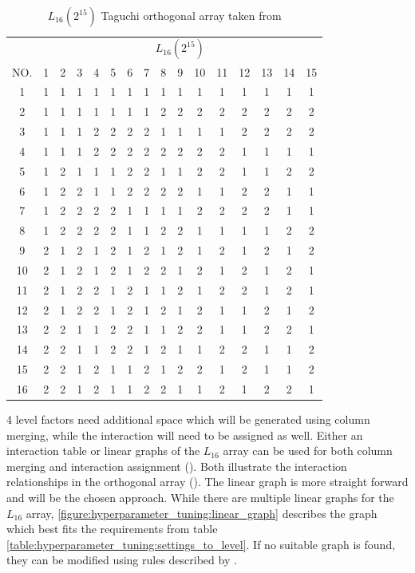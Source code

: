 \begin{table}[h]
	\label{table:hyperparameter_tuning:L16_orhtogonal_array}
	\centering
\begin{tabular}{ |c||c|c|c|c|c|c|c|c|c|c|c|c|c|c|c|  }
	\hline
	   & \multicolumn{15}{c|}{ $L_{16}(2^{15})$ } \\
	NO.& 1 & 2 & 3 & 4 & 5 & 6 & 7 & 8 & 9 & 10& 11& 12& 13& 14&15\\
	\hline
	1  & 1 & 1 & 1 & 1 & 1 & 1 & 1 & 1 & 1 & 1 & 1 & 1 & 1 & 1 & 1\\
	2  & 1 & 1 & 1 & 1 & 1 & 1 & 1 & 2 & 2 & 2 & 2 & 2 & 2 & 2 & 2\\
	3  & 1 & 1 & 1 & 2 & 2 & 2 & 2 & 1 & 1 & 1 & 1 & 2 & 2 & 2 & 2\\
	4  & 1 & 1 & 1 & 2 & 2 & 2 & 2 & 2 & 2 & 2 & 2 & 1 & 1 & 1 & 1\\
	5  & 1 & 2 & 1 & 1 & 1 & 2 & 2 & 1 & 1 & 2 & 2 & 1 & 1 & 2 & 2\\
	6  & 1 & 2 & 2 & 1 & 1 & 2 & 2 & 2 & 2 & 1 & 1 & 2 & 2 & 1 & 1\\
	7  & 1 & 2 & 2 & 2 & 2 & 1 & 1 & 1 & 1 & 2 & 2 & 2 & 2 & 1 & 1\\
	8  & 1 & 2 & 2 & 2 & 2 & 1 & 1 & 2 & 2 & 1 & 1 & 1 & 1 & 2 & 2\\
	9  & 2 & 1 & 2 & 1 & 2 & 1 & 2 & 1 & 2 & 1 & 2 & 1 & 2 & 1 & 2\\
	10 & 2 & 1 & 2 & 1 & 2 & 1 & 2 & 2 & 1 & 2 & 1 & 2 & 1 & 2 & 1\\
	11 & 2 & 1 & 2 & 2 & 1 & 2 & 1 & 1 & 2 & 1 & 2 & 2 & 1 & 2 & 1\\
	12 & 2 & 1 & 2 & 2 & 1 & 2 & 1 & 2 & 1 & 2 & 1 & 1 & 2 & 1 & 2\\
	13 & 2 & 2 & 1 & 1 & 2 & 2 & 1 & 1 & 2 & 2 & 1 & 1 & 2 & 2 & 1\\
	14 & 2 & 2 & 1 & 1 & 2 & 2 & 1 & 2 & 1 & 1 & 2 & 2 & 1 & 1 & 2\\
	15 & 2 & 2 & 1 & 2 & 1 & 1 & 2 & 1 & 2 & 2 & 1 & 2 & 1 & 1 & 2\\
	16 & 2 & 2 & 1 & 2 & 1 & 1 & 2 & 2 & 1 & 1 & 2 & 1 & 2 & 2 & 1\\
	\hline
\end{tabular}
\caption{ $L_{16}(2^{15})$ Taguchi orthogonal array taken from \cite{roy_primer_1990}}
\end{table}

4 level factors need additional space which will be generated using column merging, while the interaction will need to be assigned as well.
Either an interaction table or linear graphs of the $L_{16}$ array can be used for both column merging and interaction assignment (\cite{nazandanacioglu_taguchi_2005}). Both illustrate the interaction relationships in the orthogonal array (\cite{yang_design_2009}).
The linear graph is more straight forward and will be the chosen approach. While there are multiple linear graphs for the $L_{16}$ array, \ref{figure:hyperparameter_tuning:linear_graph} describes the graph which best fits the requirements from table \ref{table:hyperparameter_tuning:settings_to_level}. If no suitable graph is found, they can be modified using rules described by \cite{nazandanacioglu_taguchi_2005}.

